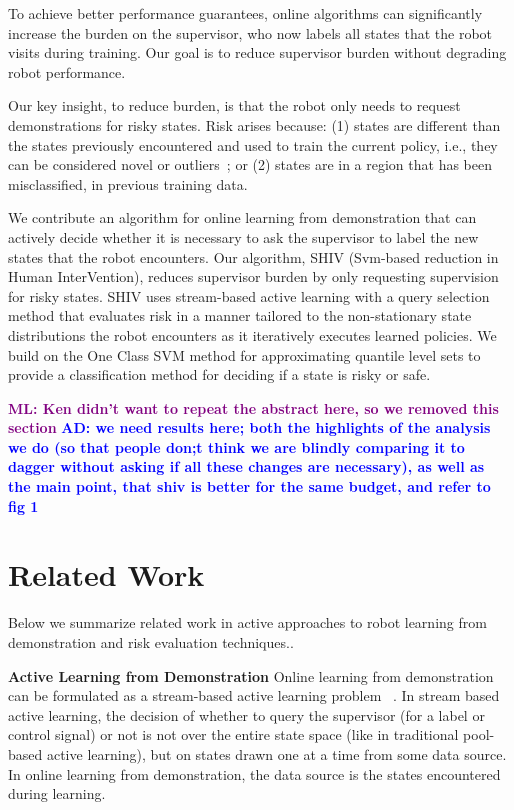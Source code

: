 \documentclass[10pt, conference]{ieeeconf}      %
\newcommand{\adnote}[1]{\ifthenelse{\boolean{include-notes}}%
 {\textcolor{blue}{\textbf{AD: #1}}}{}}
\newcommand{\mlnote}[1]{\ifthenelse{\boolean{include-notes}}%
 {\textcolor{purple}{\textbf{ML: #1}}}{}}
\begin{document}
To achieve better performance guarantees, online algorithms can significantly increase the burden on the supervisor, who now labels all states that the robot visits during training.  Our goal is to reduce supervisor burden without degrading robot performance.

Our key insight, to reduce burden, is that the robot only needs to request demonstrations for risky states. Risk arises because:  (1) states are different than the states previously encountered and used to train the current policy, i.e., they can be considered novel or outliers~\cite{hodge2004survey}; or (2) states are in a region that has been misclassified, in previous training data.


We contribute an algorithm for online learning from demonstration that can actively decide whether it is necessary to ask the supervisor to label the new states that the robot encounters. Our algorithm, SHIV  (Svm-based reduction in Human InterVention), reduces supervisor burden by only requesting supervision for risky states. SHIV uses stream-based active learning with a query selection method that evaluates risk in a manner tailored to the non-stationary state distributions the robot encounters as it iteratively executes learned policies. We build on the One Class SVM method for approximating quantile level sets \cite{scholkopf2001estimating} to provide a classification method for deciding if a state is risky or safe.

\mlnote{Ken didn't want to repeat the abstract here, so we removed this section}
\adnote{we need results here; both the highlights of the analysis we do (so that people don;t think we are blindly comparing it to dagger without asking if all these changes are necessary), as well as the main point, that shiv is better for the same budget, and refer to fig 1}





\section{Related Work}
Below we summarize related work in active approaches to robot learning from demonstration and risk evaluation techniques.. 

\noindent\textbf{Active Learning from Demonstration}
Online learning from demonstration can be formulated as a stream-based active learning problem ~\cite{atlas1990training,cohn1994improving}. In stream based active learning, the decision of whether to query the supervisor (for a label or control signal) or not is not over the entire state space (like in traditional pool-based active learning), but on states drawn one at a time from some data source. In  online learning  from demonstration, the data source is the states encountered during learning. 
\end{document}

